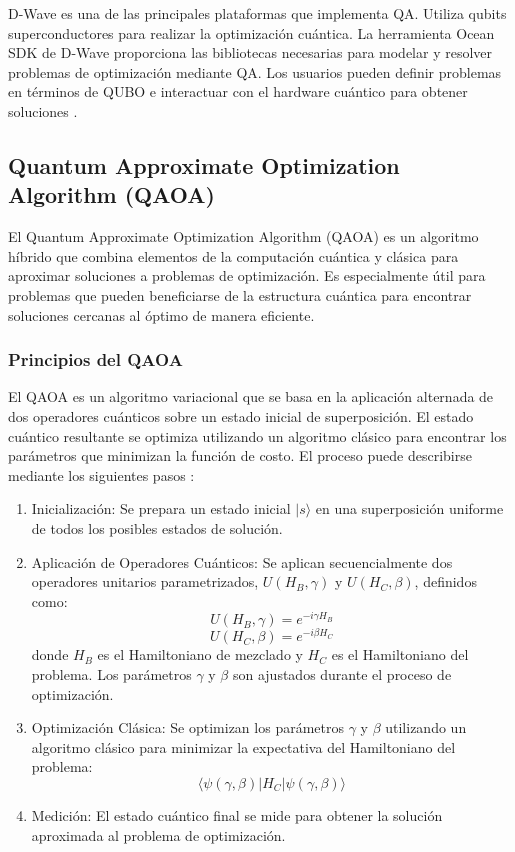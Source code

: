 \documentclass[11pt,a4paper,spanish]{book}
\begin{document}
\begin{itemize}
D-Wave es una de las principales plataformas que implementa QA. Utiliza qubits superconductores para realizar la optimización cuántica. La herramienta Ocean SDK de D-Wave proporciona las bibliotecas necesarias para modelar y resolver problemas de optimización mediante QA. Los usuarios pueden definir problemas en términos de QUBO e interactuar con el hardware cuántico para obtener soluciones \cite{gibneyQuantumTech}.

\subsection{Quantum Approximate Optimization Algorithm (QAOA)}

El Quantum Approximate Optimization Algorithm (QAOA) es un algoritmo híbrido que combina elementos de la computación cuántica y clásica para aproximar soluciones a problemas de optimización. Es especialmente útil para problemas que pueden beneficiarse de la estructura cuántica para encontrar soluciones cercanas al óptimo de manera eficiente.

\subsubsection{Principios del QAOA}

El QAOA es un algoritmo variacional que se basa en la aplicación alternada de dos operadores cuánticos sobre un estado inicial de superposición. El estado cuántico resultante se optimiza utilizando un algoritmo clásico para encontrar los parámetros que minimizan la función de costo. El proceso puede describirse mediante los siguientes pasos \cite{farhiQuantum}:

\begin{enumerate}
	\item Inicialización: Se prepara un estado inicial \(\lvert s \rangle\) en una superposición uniforme de todos los posibles estados de solución.
	\item Aplicación de Operadores Cuánticos: Se aplican secuencialmente dos operadores unitarios parametrizados, \(U(H_B, \gamma)\) y \(U(H_C, \beta)\), definidos como:
\[ U(H_B, \gamma) = e^{-i \gamma H_B} \]
\[ U(H_C, \beta) = e^{-i \beta H_C} \]
donde \(H_B\) es el Hamiltoniano de mezclado y \(H_C\) es el Hamiltoniano del problema. Los parámetros \(\gamma\) y \(\beta\) son ajustados durante el proceso de optimización.
	\item Optimización Clásica: Se optimizan los parámetros \(\gamma\) y \(\beta\) utilizando un algoritmo clásico para minimizar la expectativa del Hamiltoniano del problema:
\[ \langle \psi(\gamma, \beta) \lvert H_C \rvert \psi(\gamma, \beta) \rangle \]
	\item Medición: El estado cuántico final se mide para obtener la solución aproximada al problema de optimización.
\end{enumerate}


\end{itemize}
\end{document}
